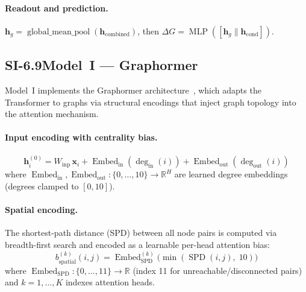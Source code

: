 \documentclass[11pt]{article}
\begin{document}
\paragraph{Readout and prediction.}
$\mathbf{h}_g = \operatorname{global\_mean\_pool}(
\mathbf{h}_{\mathrm{combined}})$, then
$\Delta G = \operatorname{MLP}([\mathbf{h}_g \| \mathbf{h}_{\mathrm{cond}}])$.

\subsection*{SI-6.9\quad Model~I --- Graphormer}
\label{si:model_i}

Model~I implements the Graphormer architecture~\cite{ying2021transformers},
which adapts the Transformer to graphs via structural encodings that
inject graph topology into the attention mechanism.

\paragraph{Input encoding with centrality bias.}
\begin{equation}
  \mathbf{h}_i^{(0)} = W_{\mathrm{inp}}\, \mathbf{x}_i
  + \operatorname{Embed}_{\mathrm{in}}(\deg_{\mathrm{in}}(i))
  + \operatorname{Embed}_{\mathrm{out}}(\deg_{\mathrm{out}}(i))
  \label{eq:centrality}
\end{equation}
where $\operatorname{Embed}_{\mathrm{in}},
\operatorname{Embed}_{\mathrm{out}}: \{0, \ldots, 10\}
\to \mathbb{R}^{H}$ are learned degree embeddings (degrees clamped
to $[0, 10]$).

\paragraph{Spatial encoding.}
The shortest-path distance (SPD) between all node pairs is computed via
breadth-first search and encoded as a learnable per-head attention bias:
\begin{equation}
  b_{\mathrm{spatial}}^{(k)}(i, j) =
  \operatorname{Embed}_{\mathrm{SPD}}^{(k)}\!\bigl(
    \min(\operatorname{SPD}(i,j),\; 10)
  \bigr)
  \label{eq:spatial_enc}
\end{equation}
where $\operatorname{Embed}_{\mathrm{SPD}}: \{0, \ldots, 11\}
\to \mathbb{R}$ (index 11 for unreachable/disconnected pairs) and
$k = 1, \ldots, K$ indexes attention heads.
\end{document}
